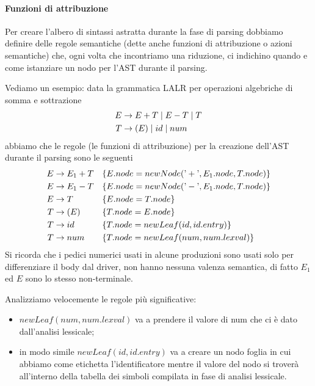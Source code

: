 \documentclass[class=book, crop=false, oneside, 12pt]{standalone}
\begin{document}
\paragraph{Funzioni di attribuzione} Per creare l'albero di sintassi astratta durante la fase di parsing dobbiamo definire delle regole semantiche (dette anche funzioni di attribuzione o azioni semantiche) che, ogni volta che incontriamo una riduzione, ci indichino quando e come istanziare un nodo per l'AST durante il parsing.

\noindent Vediamo un esempio: data la grammatica LALR per operazioni algebriche di somma e sottrazione 
\begin{align}
    \label{gr:LALR-plus-minus-grammar}
    E &\to E+T \mid E-T \mid T \\  
    T &\to (E) \mid id \mid num \notag \nonumber
\end{align}
abbiamo che le regole (le funzioni di attribuzione) per la creazione dell'AST durante il parsing sono le seguenti
\begin{align}
    \label{SDD:LALR-grammar}
    E &\to E_1+T & & \{E.node = newNode(\textrm{'}+\textrm{'}, E_1.node, T.node)\} \\
    E &\to E_1-T & & \{E.node = newNode(\textrm{'}-\textrm{'}, E_1.node, T.node)\} \notag \nonumber \\
    E &\to T & & \{E.node = T.node\} \notag \nonumber \\
    T &\to (E) & & \{T.node = E.node\} \notag \nonumber \\
    T &\to id & & \{T.node = newLeaf(id, id.entry)\} \notag \nonumber \\
    T &\to num & & \{T.node = newLeaf(num, num.lexval)\} \notag \nonumber
\end{align}
Si ricorda che i pedici numerici usati in alcune produzioni sono usati solo per differenziare il body dal driver, non hanno nessuna valenza semantica, di fatto \(E_1\) ed \(E\) sono lo stesso non-terminale.

Analizziamo velocemente le regole più significative:
\begin{itemize}
    \item \(newLeaf(num, num.lexval)\) va a prendere il valore di num che ci è dato dall'analisi lessicale; 
    \item in modo simile \(newLeaf(id, id.entry)\) va a creare un nodo foglia in cui abbiamo come etichetta l'identificatore mentre il valore del nodo si troverà all'interno della tabella dei simboli compilata in fase di analisi lessicale.
\end{itemize}
\end{document}

